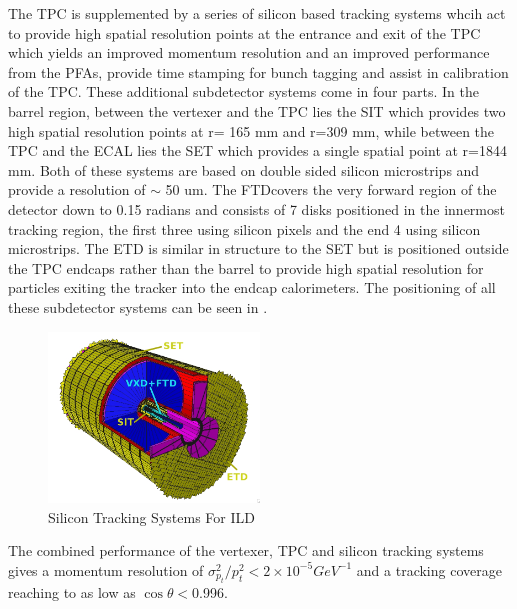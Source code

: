 The \ac{TPC} is supplemented by a series of silicon based tracking systems whcih act to provide high spatial resolution points at the entrance and exit of the TPC which yields an improved momentum resolution and an improved performance from the \ac{PFA}s, provide time stamping for bunch tagging and assist in calibration of the \ac{TPC}. These additional subdetector systems come in four parts. In the barrel region, between the vertexer and the \ac{TPC} lies the \ac{SIT} which provides two high spatial resolution points at r= 165 mm and r=309 mm, while between the \ac{TPC} and the \ac{ECAL} lies the \ac{SET} which provides a single spatial point at r=1844 mm. Both of these systems are based on double sided silicon microstrips and provide a resolution of $\sim$ 50 um. The \ac{FTD}covers the very forward region of the detector down to 0.15 radians and consists of 7 disks positioned in the innermost tracking region, the first three using silicon pixels and the end 4 using silicon microstrips. The \ac{ETD} is similar in structure to the \ac{SET} but is positioned outside the \ac{TPC} endcaps rather than the barrel to provide high spatial resolution for particles exiting the tracker into the endcap calorimeters. The positioning of all these subdetector systems can be seen in .

\begin{figure}
  \centering
  \includegraphics[width=0.5\textwidth,keepaspectratio]{Experiments/fig/SiliconTrackers}
  \caption[Silicon Tracking Systems For ILD]{Silicon Tracking Systems For ILD \cite{ILD}}
  \label{fig:silicontracking}
\end{figure}

The combined performance of the vertexer, \ac{TPC} and silicon tracking systems gives a momentum resolution of $\sigma_{p_t}^2/ p_{t}^2 < 2 \times 10^{-5} GeV^{-1}$ and a tracking coverage reaching to as low as $\cos\theta<$0.996.


